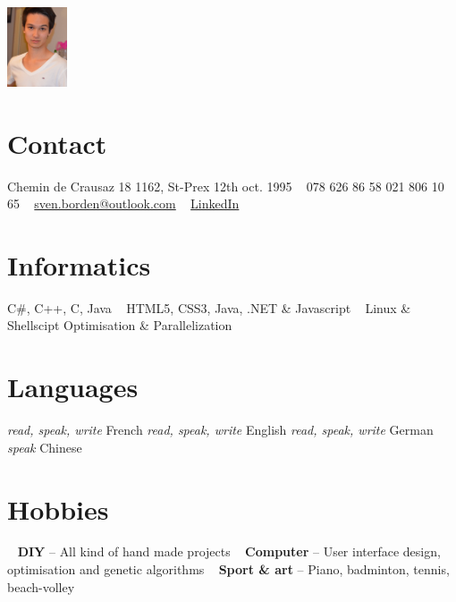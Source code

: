 \documentclass[]{friggeri-cv}
\begin{document}
	
	
	\begin{aside} %
		\includegraphics[width=50pt]{"oim.jpg"}
		\section{Contact}
		{\color{light-gray}{\FA \faHome}} \small{Chemin de Crausaz 18
		1162, St-Prex}
		{\color{light-gray}{\FA \faBirthdayCake}} \small{12th oct. 1995}
		~
		{\color{light-gray}{\FA \faMobile}} \small{078 626 86 58}
		{\color{light-gray}{\FA \faPhone}} \small{021 806 10 65}
		~
		{\color{light-gray}{\FA \faEnvelope}}\href{mailto:sven.borden@outlook.com}{\small{sven.borden@outlook.com}}
		~
		{\color{linkedin}{\FA \faLinkedin}} \href{https://www.linkedin.com/in/sven-borden-bba744a0}{LinkedIn}	
		~
		\section{Informatics}
		\small{{\color{red} \FA \faHeart} C\#, C++, C, Java
			~
			{\color{html5}\FA {}} HTML5, CSS3,
			{\color{php}\FA \faCode} Java, .NET \& Javascript
			~
			{\color{gray}\FA \faLinux} Linux \& Shellscipt
			{\color{db}\FA \faTh} Optimisation \& Parallelization}
		~
		\section{Languages}
		\small{\emph{read, speak, write} French
		\emph{read, speak, write} English
		\emph{read, speak, write} German
		\emph{speak} Chinese}
		~
		\section{\color{green}Hob\color{dark}bies}
		~
		\textbf{DIY} --  \small{All kind of hand made projects}
		~
		\textbf{Computer} --    \small{User interface design, optimisation and genetic algorithms}
		~
	\textbf{Sport \& art}  --    \small{Piano, badminton, tennis, beach-volley}
	\end{aside}
	
\end{document}
